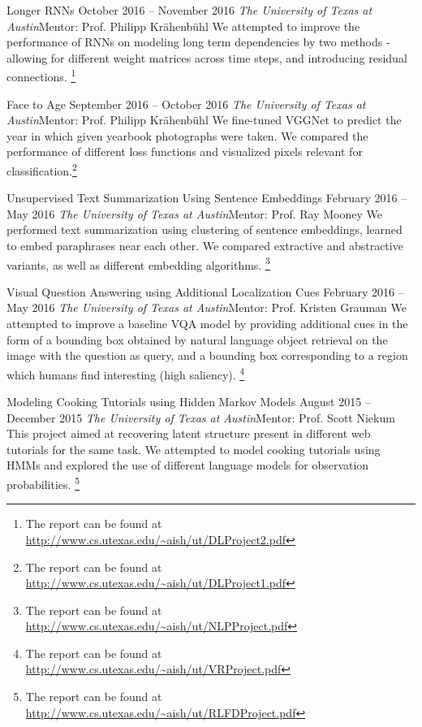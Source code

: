 \documentclass[letterpaper,10pt]{resume}
\begin{document}
{\begin{itemize}
  \credentialtwo
    {{Longer RNNs}}
    {\sf October 2016 -- November 2016}
    {\it The University of Texas at Austin}{\textsf{Mentor: Prof. Philipp Kr\"ahenb\"uhl}}
    {}
    { 
    \small 
	We attempted to improve the performance of RNNs on modeling long term dependencies by two methods - allowing for different weight matrices across time steps, and introducing residual connections. \footnote{The report can be found at \url{http://www.cs.utexas.edu/~aish/ut/DLProject2.pdf}}  
    }
   \vspace{0.2cm}   
 
  \credentialtwo
    {{Face to Age}}
    {\sf September 2016 -- October 2016}
    {\it The University of Texas at Austin}{\textsf{Mentor: Prof. Philipp Kr\"ahenb\"uhl}}
    {}
    { 
    \small 
	We fine-tuned VGGNet to predict the year in which given yearbook photographs were  taken. We compared the performance of different loss functions and visualized pixels relevant for classification.\footnote{The report can be found at \url{http://www.cs.utexas.edu/~aish/ut/DLProject1.pdf}} 
    }
   \vspace{0.2cm}  
 
  \credentialtwo
    {{Unsupervised Text Summarization Using Sentence Embeddings}}
    {\sf February 2016 -- May 2016}
    {\it The University of Texas at Austin}{\textsf{Mentor: Prof. Ray Mooney}}
    {}
    { 
    \small 
	We performed text summarization using clustering of sentence embeddings, learned to embed paraphrases near each other. We compared extractive and abstractive variants, as well as different embedding algorithms. \footnote{The report can be found at \url{http://www.cs.utexas.edu/~aish/ut/NLPProject.pdf}}
    }
   \vspace{0.2cm}
   
  \credentialtwo
    {{Visual Question Answering using Additional Localization Cues}}
    {\sf February 2016 -- May 2016}
    {\it The University of Texas at Austin}{\textsf{Mentor: Prof. Kristen Grauman}}
    {}
    { 
    \small 
	We attempted to improve a baseline VQA model by providing additional cues in the form of a bounding box obtained by natural language object retrieval on the image with the question as query, and a bounding box corresponding to a region which humans find interesting (high saliency). \footnote{The report can be found at \url{http://www.cs.utexas.edu/~aish/ut/VRProject.pdf}}
    }
   \vspace{0.2cm}
 
  \credentialtwo
    {{Modeling  Cooking  Tutorials  using  Hidden  Markov  Models}}
    {\sf August 2015 -- December 2015}
    {\it The University of Texas at Austin}{\textsf{Mentor: Prof. Scott Niekum}}
    {}
    { 
    \small This project aimed at recovering latent structure present in different web tutorials for the same task. We attempted to model cooking tutorials using HMMs and explored the use of different language models for observation probabilities. \footnote{The report can be found at \url{http://www.cs.utexas.edu/~aish/ut/RLFDProject.pdf}}
    }
   \vspace{0.2cm}
   

\end{itemize}}
\end{document}
